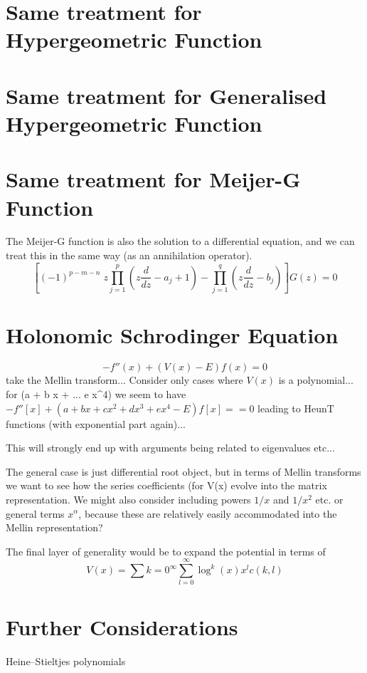 \documentclass{article}
\begin{document}
\section{Same treatment for Hypergeometric Function}

\section{Same treatment for Generalised Hypergeometric Function}


\section{Same treatment for Meijer-G Function}
The Meijer-G function is also the solution to a differential equation, and we can treat this in the same way (as an annihilation operator).
$$
\left[ (-1)^{p - m - n} \;z \prod_{j = 1}^p \left( z \frac{d}{dz} - a_j + 1 \right) - \prod_{j = 1}^q \left( z \frac{d}{dz} - b_j \right) \right] G(z) = 0
$$


\section{Holonomic Schrodinger Equation}
$$
- f''(x) + (V(x)-E)f(x) = 0
$$
take the Mellin transform... Consider only cases where $V(x)$ is a polynomial... for (a + b x + ... e x^4) we seem to have $-f''[x] + (a + b x + c x^2 + d x^3 + e x^4 - E)f[x] == 0$ leading to HeunT functions (with exponential part again)... 

This will strongly end up with arguments being related to eigenvalues etc...

The general case is just differential root object, but in terms of Mellin transforms we want to see how the series coefficients (for V(x) evolve into the matrix representation. We might also consider including powers $1/x$ and $1/x^2$ etc. or general terms $x^\alpha$, because these are relatively easily accommodated into the Mellin representation?

The final layer of generality would be to expand the potential in terms of 
$$
V(x) = \sum{k=0}^\infty\sum_{l=0}^\infty \log^k(x) x^l c(k,l) 
$$


\section{Further Considerations}
Heine–Stieltjes polynomials


{}

\end{document}
